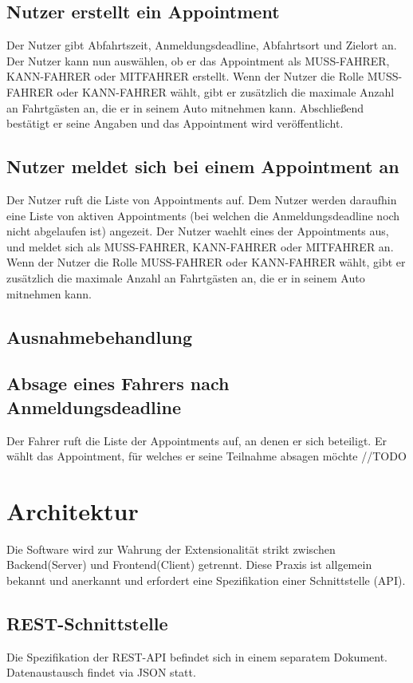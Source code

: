 \documentclass[11pt,a4paper]{article}
\begin{document}
\subsection*{Nutzer erstellt ein Appointment}
Der Nutzer gibt Abfahrtszeit, Anmeldungsdeadline, Abfahrtsort und Zielort an. Der Nutzer kann nun auswählen, ob er das Appointment als MUSS-FAHRER, KANN-FAHRER oder MITFAHRER erstellt. Wenn der Nutzer die Rolle MUSS-FAHRER oder KANN-FAHRER wählt, gibt er zusätzlich die maximale Anzahl an Fahrtgästen an, die er in seinem Auto mitnehmen kann. Abschließend bestätigt er seine Angaben und das Appointment wird veröffentlicht.

\subsection*{Nutzer meldet sich bei einem Appointment an}
Der Nutzer ruft die Liste von Appointments auf. Dem Nutzer werden daraufhin eine Liste von aktiven Appointments (bei welchen die Anmeldungsdeadline noch nicht abgelaufen ist) angezeit. Der Nutzer waehlt eines der Appointments aus, und meldet sich als MUSS-FAHRER, KANN-FAHRER oder MITFAHRER an. Wenn der Nutzer die Rolle MUSS-FAHRER oder KANN-FAHRER wählt, gibt er zusätzlich die maximale Anzahl an Fahrtgästen an, die er in seinem Auto mitnehmen kann.

\subsection{Ausnahmebehandlung}
\subsection*{Absage eines Fahrers nach Anmeldungsdeadline}
Der Fahrer ruft die Liste der Appointments auf, an denen er sich beteiligt. Er wählt das Appointment, für welches er seine Teilnahme absagen möchte //TODO

\section{Architektur}
Die Software wird zur Wahrung der Extensionalität strikt zwischen Backend(Server) und Frontend(Client) getrennt. Diese Praxis ist allgemein bekannt und anerkannt und erfordert eine Spezifikation einer Schnittstelle (API).
\subsection{REST-Schnittstelle}
Die Spezifikation der REST-API befindet sich in einem separatem Dokument.
Datenaustausch findet via JSON statt.
\end{document}
